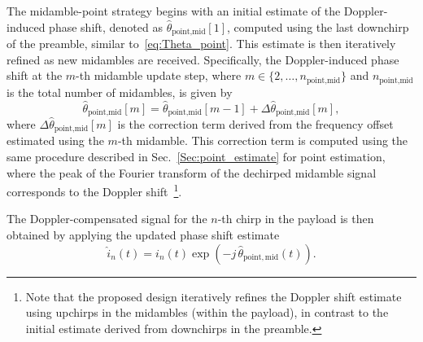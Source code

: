 \documentclass{IEEEtran}
\begin{document}
The midamble-point strategy begins with an initial estimate of the Doppler-induced phase shift, denoted as $\hat{\theta}_{\text{point,mid}}[1]$, computed using the last downchirp of the preamble, similar to~\eqref{eq:Theta_point}. This estimate is then iteratively refined as new midambles are received. Specifically, the Doppler-induced phase shift at the $m$-th midamble update step, where $m \in \{2, \dots, n_{\text{point,mid}}\}$ and $n_{\text{point,mid}}$ is the total number of midambles, is given by
\begin{equation}
\hat{\theta}_{\text{point,mid}}[m] = \hat{\theta}_{\text{point,mid}}[m-1] + \Delta \hat{\theta}_{\text{point,mid}}[m],
\label{eq:midamble_point_phase_update}
\end{equation}
where $\Delta \hat{\theta}_{\text{point,mid}}[m]$ is the correction term derived from the frequency offset estimated using the $m$-th midamble. This correction term is computed using the same procedure described in Sec.~\ref{Sec:point_estimate} for point estimation, where the peak of the Fourier transform of the dechirped midamble signal corresponds to the Doppler shift~\footnote{Note that the proposed design iteratively refines the Doppler shift estimate using upchirps in the midambles (within the payload), in contrast to the initial estimate derived from downchirps in the preamble.}.

The Doppler-compensated signal for the $n$-th chirp in the payload is then obtained by applying the updated phase shift estimate
\begin{equation}
\hat{i}_n(t) = i_n(t) \exp\left(-j \, \hat{\theta}_{\mathrm{point,mid}}(t)\right).
\label{eq:midamble_point_compensated_signal}
\end{equation}
\end{document}
